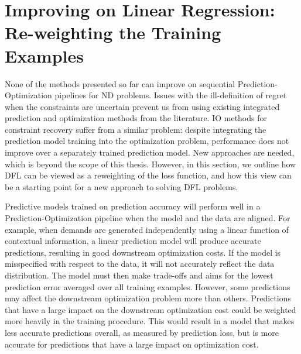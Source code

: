 

\section{Improving on Linear Regression: Re-weighting the Training Examples} \label{sec:methodology:weightings}

None of the methods presented so far can improve on sequential Prediction-Optimization pipelines for ND problems. Issues with the ill-definition of regret when the constraints are uncertain prevent us from using existing integrated prediction and optimization methods from the literature. IO methods for constraint recovery suffer from a similar problem: despite integrating the prediction model training into the optimization problem, performance does not improve over a separately trained prediction model. New approaches are needed, which is beyond the scope of this thesis. However, in this section, we outline how DFL can be viewed as a reweighting of the loss function, and how this view can be a starting point for a new approach to solving DFL problems.

Predictive models trained on prediction accuracy will perform well in a Prediction-Optimization pipeline when the model and the data are aligned. For example, when demands are generated independently using a linear function of contextual information, a linear prediction model will produce accurate predictions, resulting in good downstream optimization costs. If the model is misspecified with respect to the data, it will not accurately reflect the data distribution. The model must then make trade-offs and aims for the lowest prediction error averaged over all training examples. However, some predictions may affect the downstream optimization problem more than others. Predictions that have a large impact on the downstream optimization cost could be weighted more heavily in the training procedure. This would result in a model that makes less accurate predictions overall, as measured by prediction loss, but is more accurate for predictions that have a large impact on optimization cost. 

